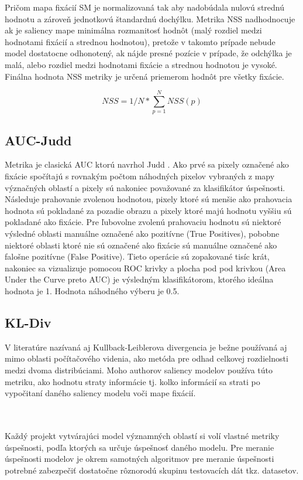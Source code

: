 Pričom mapa fixácií SM je normalizovaná tak aby nadobúdala nulovú strednú hodnotu a zároveň jednotkovú štandardnú dochýlku.
Metrika NSS nadhodnocuje ak je saliency mape minimálna rozmanitosť hodnôt (malý rozdiel medzi hodnotami fixácií a strednou hodnotou), pretože v takomto prípade nebude model dostatocne odhonotený, ak nájde presné pozície v prípade, že odchýlka je malá, alebo
rozdiel medzi hodnotami fixácie a strednou hodnotou je vysoké.
Finálna hodnota NSS metriky je určená priemerom hodnôt pre všetky fixácie\cite{metrics-1}.

\begin{equation}
  NSS = 1/N * \sum_{p=1}^{N}NSS(p)
\end{equation}

\subsection{AUC-Judd}
Metrika je clasická AUC ktorú navrhol Judd \cite{auc-judd}.
Ako prvé sa pixely označené ako fixácie spočítajú s rovnakým počtom náhodných pixelov vybraných z mapy význačných oblastí a pixely sú nakoniec považované za klasifikátor úspešnosti.
Následuje prahovanie zvolenou hodnotou, pixely ktoré sú menšie ako prahovacia hodnota sú pokladané za pozadie obrazu a pixely ktoré majú hodnotu vyššiu sú pokladané ako fixácie.
Pre ľubovolne zvolenú prahovaciu hodnotu sú niektoré výsledné oblasti manuálne označené ako pozitívne (True Positives), pobobne niektoré oblasti ktoré nie sú označené ako fixácie sú manuálne označené ako falošne pozitívne (False Positive).
Tieto operácie sú zopakované tisíc krát, nakoniec sa vizualizuje pomocou ROC krivky a plocha pod pod krivkou (Area Under the Curve preto AUC) je výsledným klasifikátorom, ktorého ideálna hodnota je 1.
Hodnota náhodného výberu je 0.5.

\subsection{KL-Div}
V literatúre nazívaná aj Kullback-Leiblerova divergencia je bežne používaná aj mimo oblasti počítačového videnia, ako metóda pre odhad celkovej rozdielnosti medzi dvoma distribúciami.
Moho authorov saliency modelov používa túto metriku, ako hodnotu straty informácie tj. kolko informácií sa strati po vypočitaní daného saliency modelu voči mape fixácií.

\\
\\

Každý projekt vytvárajúci model významných oblastí si volí vlastné metriky úspešnosti, podľa ktorých sa určuje úspešnosť daného modelu.
Pre meranie úspešnosti modelov je okrem samotných algoritmov pre meranie úspešnosti potrebné zabezpečiť dostatočne rôznorodú skupinu testovacích dát tkz.
datasetov.

